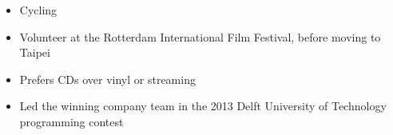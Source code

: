 





\begin{itemize}
\item\small{Cycling}
\item\small{Volunteer at the Rotterdam International Film Festival, before moving to Taipei}
\item\small{Prefers CDs over vinyl or streaming}
\item\small{Led the winning company team in the 2013 Delft University of Technology programming contest}
\end{itemize}

%